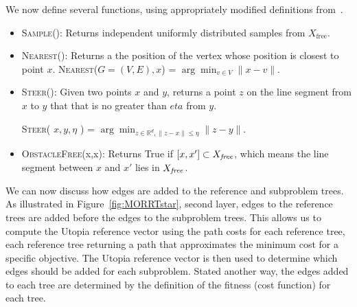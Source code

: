 \documentclass{article}
\begin{document}
We now define several functions, using appropriately modified definitions from~\cite{Karaman.Frazzoli:RSS10}.
\begin{itemize}
\item \textsc{Sample}():
Returns independent uniformly distributed samples from $ X_{\mbox{free}} $. 

\item \textsc{Nearest}():
Returns a the position of the vertex whose position is closest to point $ x $.
\textsc{Nearest}($ G = (V,E), x $) = $ \arg \min_{v \in V} \lVert x - v \rVert $.
	
\item \textsc{Steer}(): Given two points $ x $ and $ y $, returns a point $ z $ on the line segment from $x$ to $y$ that that is no greater than $eta$ from $y$. 

\textsc{Steer}( $ x,y,\eta $ ) = $ \arg \min_{ z \in \mathbb{R}^{d}, \lVert z -x \rVert \leq \eta } \lVert z - y \rVert $.

\item \textsc{ObstacleFree}(x,x): Returns True if $ [ x, x' ] \subset X_{\it free} $, which means the line segment between $ x $ and $ x' $ lies in $ X_{\it free} $.

\end{itemize}


We can now discuss how edges are added to the reference and subproblem trees.  
As illustrated in Figure~\ref{fig:MORRTstar}, second layer, edges to the reference trees are added before the edges to the subproblem trees.  
This allows us to compute the Utopia reference vector using the path costs for each reference tree, each reference tree returning a path that approximates the minimum cost for a specific objective.  
The Utopia reference vector is then used to determine which edges should be added for each subproblem. Stated another way, the edges added to each tree are determined by the definition of the fitness (cost function) for each tree.

\end{document}

